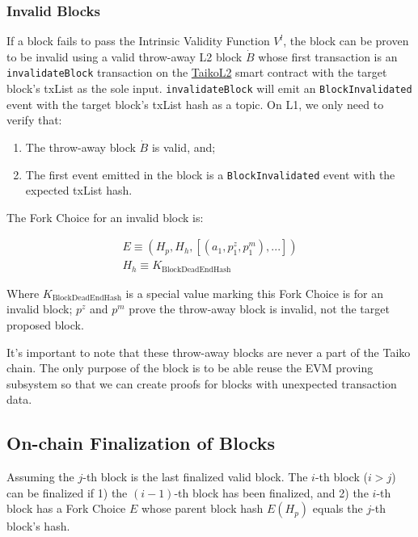 \documentclass[9pt,oneside]{amsart}
\begin{document}
\begin{multicols}{2}
\subsubsection{Invalid Blocks} \label{sec:proving-invalid}

If a block fails to pass the Intrinsic Validity Function $V^l$, the block can be proven to be invalid using a valid throw-away L2 block $\dot{B}$ whose first transaction is an \texttt{invalidateBlock} transaction on the \underline{TaikoL2} smart contract with the target block's txList as the sole input. \texttt{invalidateBlock} will emit an \texttt{BlockInvalidated} event with the target block's txList hash as a topic. On L1, we only need to verify that:

\begin{enumerate}
\item The throw-away block $\dot{B}$ is valid, and;
\item The first event emitted in the block is a \texttt{BlockInvalidated} event with the expected txList hash. 
\end{enumerate}

The Fork Choice for an invalid block is:

\begin{eqnarray}
E \equiv (H_p, H_h, [(a_1, p^{z}_1, p^{m}_1),...]) \\
H_h \equiv K_{\mathrm{BlockDeadEndHash}}
\end{eqnarray}

Where $K_{\mathrm{BlockDeadEndHash}}$ is a special value marking this Fork Choice is for an invalid block; $p^{z}$ and  $p^{m}$ prove the throw-away block is invalid, not the target proposed block.

It's important to note that these throw-away blocks are never a part of the Taiko chain. The only purpose of the block is to be able reuse the EVM proving subsystem so that we can create proofs for blocks with unexpected transaction data.

\subsection{On-chain Finalization of Blocks}\label{sec:finalizing}

Assuming the $j$-th block is the last finalized valid block. The $i$-th block ($i > j$) can be finalized if 1) the $(i-1)$-th block has been finalized, and 2) the $i$-th block has a Fork Choice $E$ whose parent block hash $E(H_p)$ equals the $j$-th block's hash.


\end{multicols}
\end{document}
